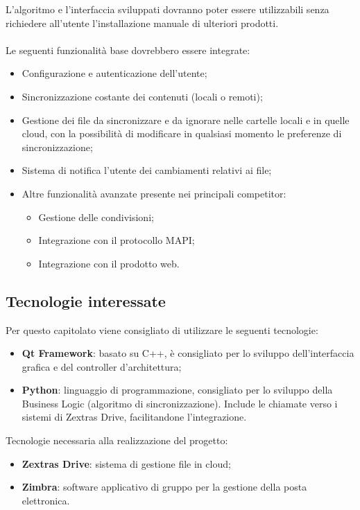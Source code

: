 \documentclass[../studio-di-fattibilita.tex]{subfiles}
\begin{document}
L’algoritmo e l’interfaccia sviluppati dovranno poter essere utilizzabili senza richiedere all’utente l’installazione manuale di ulteriori prodotti.\\ \\

Le seguenti funzionalità base dovrebbero essere integrate:
\begin{itemize}
  \item Configurazione e autenticazione dell’utente;
  \item Sincronizzazione costante dei contenuti (locali o remoti);
  \item Gestione dei file da sincronizzare e da ignorare nelle cartelle locali e in quelle cloud, con la possibilità di modificare in qualsiasi momento le preferenze di sincronizzazione;
  \item Sistema di notifica l’utente dei cambiamenti relativi ai file; 
  \item Altre funzionalità avanzate presente nei principali competitor:
  \begin{itemize}
    \item Gestione delle condivisioni;
    \item Integrazione con il protocollo MAPI;
    \item Integrazione con il prodotto web.
  \end{itemize}
\end{itemize}

\subsection{Tecnologie interessate}%
\label{sub:c7_tecnologie_interessate}
Per questo capitolato viene consigliato di utilizzare le seguenti tecnologie:
\begin{itemize}
  \item \textbf{Qt Framework}: basato su C++, è consigliato per lo sviluppo dell’interfaccia grafica e del controller d’architettura;
  \item \textbf{Python}: linguaggio di programmazione, consigliato per lo sviluppo della Business Logic (algoritmo di sincronizzazione). Include le chiamate  verso i sistemi di Zextras Drive, facilitandone l’integrazione.
\end{itemize}

Tecnologie necessaria alla realizzazione del progetto:
\begin{itemize}
  \item \textbf{Zextras Drive}: sistema di gestione file in cloud;
  \item \textbf{Zimbra}: software applicativo di gruppo per la gestione della posta elettronica.
\end{itemize}
\end{document}
